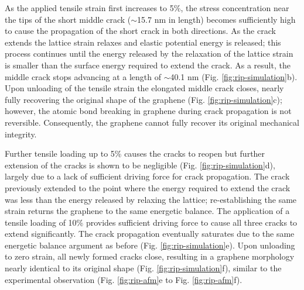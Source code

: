 \documentclass[edeposit,fullpage,draftthesis]{uiucthesis2009}
\begin{document}
        As the applied tensile strain first increases to 5\%, the stress concentration
        near the tips of the short middle crack ($\sim$15.7 nm in length) becomes
        sufficiently high to cause the propagation of the short crack in both
        directions. As the crack extends the lattice strain relaxes and elastic
        potential energy is released; this process continues until the energy
        released by the relaxation of the lattice strain is smaller than the surface energy
        required to extend the crack. As a result, the middle crack
        stops advancing at a length of $\sim$40.1 nm (Fig. \ref{fig:rip-simulation}b). Upon unloading of the
        tensile strain the elongated middle crack closes, nearly fully recovering the
        original shape of the graphene (Fig. \ref{fig:rip-simulation}c); however, the atomic bond breaking in
        graphene during crack propagation is not reversible. Consequently, the graphene
        cannot fully recover its original mechanical integrity.
        
        Further tensile loading up to 5\% causes the cracks to reopen but further
        extension of the cracks is shown to be negligible (Fig. \ref{fig:rip-simulation}d), largely due to a
        lack of sufficient driving force for crack propagation. The crack
        previously extended to the point where the energy required to extend the crack
        was less than the energy released by relaxing the lattice; re-establishing
        the same strain returns the graphene to the same energetic balance. The application of a
        tensile loading of 10\% provides sufficient driving force to cause all three
        cracks to extend significantly. The crack propagation eventually saturates due
        to the same energetic balance argument as before (Fig. \ref{fig:rip-simulation}e). Upon
        unloading to zero strain, all newly formed cracks close, resulting in a
        graphene morphology nearly identical to its original shape (Fig. \ref{fig:rip-simulation}f), similar
        to the experimental observation (Fig. \ref{fig:rip-afm}e to Fig. \ref{fig:rip-afm}f).
        
\end{document}
